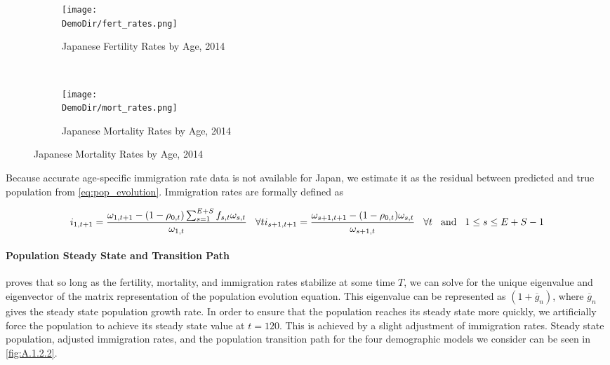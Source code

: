 \documentclass[10pt]{article}
\renewcommand{\thesection}{\arabic{section}}
\renewcommand{\thesubsection}{\thesection.\arabic{subsection}}
\renewcommand{\thesubsubsection}{\thesubsection.\arabic{subsubsection}}
\numberwithin{equation}{subsection}
\newcommand*{\DemoDir}{../../code/Rick/OUTPUT/Demographics}
\begin{document}
\begin{appendices}
\begin{figure}[H]
   \caption{\label{fig:\thesubsubsection.1}Fertility and Mortality Rates by Age}
   \begin{subfigure}{0.5\textwidth}
      \centering
      \texttt{[image: \\DemoDir/fert\_rates.png]}
      \caption{Japanese Fertility Rates by Age, 2014}
   \end{subfigure}%
   ~ %
   \begin{subfigure}{0.5\textwidth}
      \centering
      \texttt{[image: \\DemoDir/mort\_rates.png]}
      \caption{Japanese Mortality Rates by Age, 2014}
   \end{subfigure}
\end{figure}

\par Because accurate age-specific immigration rate data is not available for Japan, we estimate it as the residual between predicted and true population from \ref{eq:pop_evolution}. Immigration rates are formally defined as

\begin{dmath}
   {i_{1,t+1} = \frac{\omega_{1,t+1} - (1-\rho_{0,t})\sum_{s=1}^{E+S}f_{s,t}\omega_{s,t}}{\omega_{1,t}} \hspace{3mm} \forall t} \\
   {i_{s+1,t+1} = \frac{\omega_{s+1,t+1} - (1-\rho_{0,t})\omega_{s,t}}{\omega_{s+1,t}} \hspace{3mm} \forall t \hspace{3mm} \text{and} \hspace{3mm} 1 \leq s \leq E + S - 1}
\end{dmath}


\paragraph{Population Steady State and Transition Path}

\par \cite{E2020} proves that so long as the fertility, mortality, and immigration rates stabilize at some time \(T\), we can solve for the unique eigenvalue and eigenvector of the matrix representation of the population evolution equation. This eigenvalue can be represented as \((1 + \overline{g}_n)\), where \(\overline{g}_n\) gives the steady state population growth rate. In order to ensure that the population reaches its steady state more quickly, we artificially force the population to achieve its steady state value at \(t=120\). This is achieved by a slight adjustment of immigration rates. Steady state population, adjusted immigration rates, and the population transition path for the four demographic models we consider can be seen in \autoref{fig:A.1.2.2}.


\end{appendices}
\end{document}
